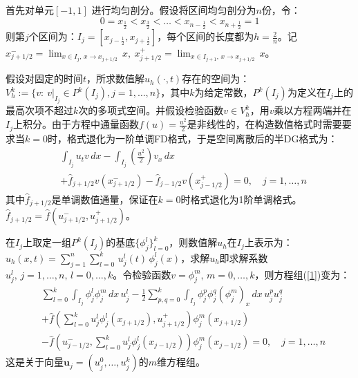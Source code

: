 \documentclass[12pt, a4paper]{ctexart}
\begin{document}
	首先对单元$[-1,1]$ 进行均匀剖分。假设将区间均匀剖分为$n$份，令：
	\begin{equation}
	0 = x_{\frac{1}{2}} < x_{\frac{3}{2}} < \dots < x_{n-\frac{1}{2}} < x_{n+\frac{1}{2}} = 1
	\end{equation}
	则第$j$个区间为：$ I_j = [x_{j- \frac{1}{2}}, x_{j + \frac{1}{2}}]$，每个区间的长度都为$h = \frac{2}{n}$。记$x_{j+1/2}^- = \lim_{x \in I_j, \, x \to x_{j+1/2}} \, x, \  x_{j+1/2}^+ = \lim_{x \in I_{j+1}, \, x \to x_{j+1/2}} \, x$。
	
	假设对固定的时间$t$，所求数值解$u_h(\cdot,t)$存在的空间为：$ V_h^k := \{ v : \  v|_{I_j} \in P^k(I_j), j = 1, \dots, n \}$，其中$k$为给定常数，$P^k(I_j)$为定义在$I_j$上的最高次项不超过$k$次的多项式空间。并假设检验函数$v \in V_h^k$，用$v$乘以方程两端并在$I_j$上积分。由于方程中通量函数$f(u) = \frac{u^2}{2}$是非线性的，在构造数值格式时需要要求当$k = 0$时，格式退化为一阶单调FD格式，于是空间离散后的半DG格式为：
	\begin{equation}
	\begin{split}
	& \int_{I_j} u_t v \, dx - \int_{I_j} (\frac{u^2}{2}) v_x \, dx\\
	& + \hat{f}_{j+1/2} v(x_{j+1/2}^-) - \hat{f}_{j-1/2} v(x_{j-1/2}^+) = 0, \quad j = 1,\dots,n
	\end{split}
	\label{1}
	\end{equation}
	其中$\hat{f}_{j+1/2}$是单调数值通量，保证在$k=0$时格式退化为1阶单调格式。$\hat{f}_{j+1/2} = \hat{f}(u_{j+1/2}^-, u_{j+1/2}^+)$。
	
	在$I_j$上取定一组$P^k(I_j)$的基底$\{ \phi_j^l \}_{l=0}^k$，则数值解$u_h$在$I_j$上表示为：$u_h(x,t) = \sum_{j=1}^n \sum_{l=0}^k \, u_j^l(t) \, \phi_j^l(x)$，求解$u_h$即求解系数$u_j^l, \, j=1, \dots, n, \, l=0, \dots, k$。令检验函数$v = \phi_j^m, \, m=0, \dots, k$，则方程组(\ref{1})变为：
	\begin{equation}
	\begin{split}
	& \sum_{l=0}^k \int_{I_j} \phi_j^l \phi_j^m \, dx \, u_j^l - \frac{1}{2}\sum_{p,q=0}^k \int_{I_j} \phi_j^p \phi_j^q (\phi_j^m)_x \, dx \, u_j^p u_j^q \\
	& + \hat{f}(\sum_{l=0}^k u_j^l \phi_j^l(x_{j+1/2}),u_{j+1/2}^+) \phi_j^m(x_{j+1/2})\\
	& - \hat{f}(u_{j-1/2}^-, \sum_{l=0}^k u_j^l \phi_j^l(x_{j-1/2} )) \phi_j^m(x_{j-1/2}) = 0, \quad j = 1, \dots,n
	\end{split}
	\label{2}
	\end{equation}
	这是关于向量$\textbf{u}_j = (u_j^0,\dots, u_j^k)$的$m$维方程组。
	
\end{document}
